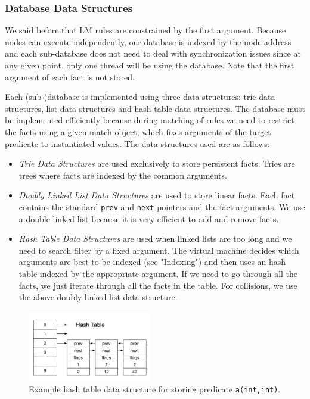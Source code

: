 \subsubsection{Database Data Structures}\label{sec:database}

We said before that LM rules are constrained by the first argument. Because nodes can execute
independently, our database is indexed by the node address and each sub-database does not
need to deal with synchronization issues since at any given point, only one thread will be using
the database. Note that the first argument of each fact is not stored.

Each (sub-)database is implemented using three data structures: trie data structures, list data structures and hash table data structures.
The database must be implemented efficiently because during matching of rules we need
to restrict the facts using a given match object, which fixes arguments of the target predicate to instantiated values. The data structures used are as follows:

\begin{itemize}
   \item \emph{Trie Data Structures} are used exclusively to store persistent facts.
   Tries are trees where facts are indexed by the common arguments.
      
   \item \emph{Doubly Linked List Data Structures} are used to store linear facts.
   Each fact contains the standard \texttt{prev} and \texttt{next} pointers
   and the fact arguments. We use a double linked list because it is very efficient to add and remove facts.
   
   \item \emph{Hash Table Data Structures} are used when linked lists are too long and we need to search filter by a fixed argument. The virtual machine decides which arguments are best to be indexed
   (see "Indexing") and then
   uses an hash table indexed by the appropriate argument. If we need to go through all the facts, we just iterate through all the facts in the table. For collisions, we use the above doubly linked list data structure.
\end{itemize}

\begin{figure}
   \vspace{-1\intextsep}
   \centering
   \includegraphics[width=0.48\textwidth]{hash_table.pdf}
   \caption{Example hash table data structure for storing predicate \texttt{a(int,int)}.}
   \label{fig:hash_table}
   \vspace{-0.5\intextsep}
\end{figure}

